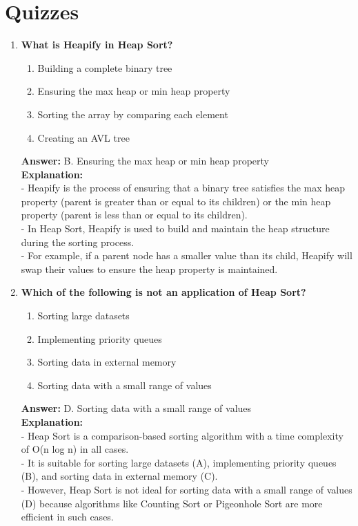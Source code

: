 \section{Quizzes}

\begin{enumerate}
    \item \textbf{What is Heapify in Heap Sort?}
    \begin{enumerate}
        \item Building a complete binary tree
        \item Ensuring the max heap or min heap property
        \item Sorting the array by comparing each element
        \item Creating an AVL tree
    \end{enumerate}
    \textbf{Answer:} B. Ensuring the max heap or min heap property \\
    \textbf{Explanation:} \\
    - Heapify is the process of ensuring that a binary tree satisfies the max heap property (parent is greater than or equal to its children) or the min heap property (parent is less than or equal to its children). \\
    - In Heap Sort, Heapify is used to build and maintain the heap structure during the sorting process. \\
    - For example, if a parent node has a smaller value than its child, Heapify will swap their values to ensure the heap property is maintained.
    
    \item \textbf{Which of the following is not an application of Heap Sort?}
    \begin{enumerate}
        \item Sorting large datasets
        \item Implementing priority queues
        \item Sorting data in external memory
        \item Sorting data with a small range of values
    \end{enumerate}
    \textbf{Answer:} D. Sorting data with a small range of values \\
    \textbf{Explanation:} \\
    - Heap Sort is a comparison-based sorting algorithm with a time complexity of O(n log n) in all cases. \\
    - It is suitable for sorting large datasets (A), implementing priority queues (B), and sorting data in external memory (C). \\
    - However, Heap Sort is not ideal for sorting data with a small range of values (D) because algorithms like Counting Sort or Pigeonhole Sort are more efficient in such cases.
    

\end{enumerate}
